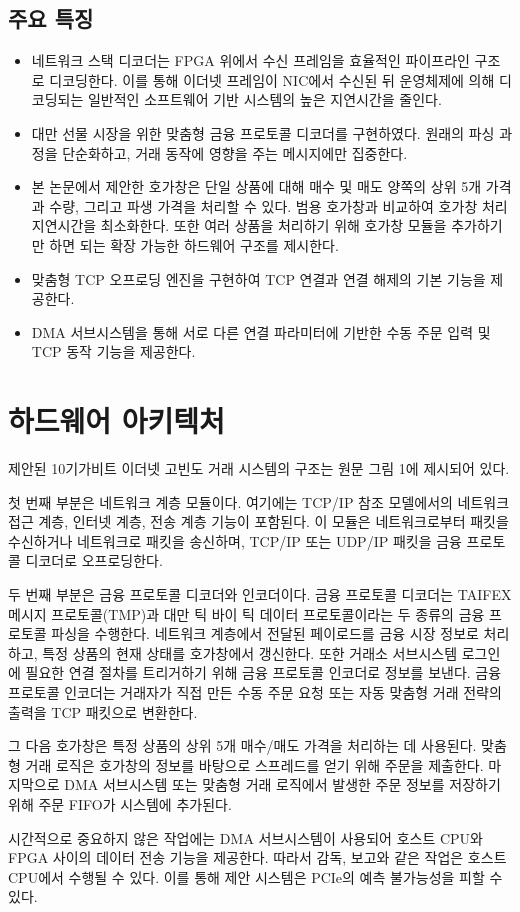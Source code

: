 \documentclass[11pt,a4paper]{article}
\begin{document}
\subsection{주요 특징}
\begin{itemize}
    \item 네트워크 스택 디코더는 FPGA 위에서 수신 프레임을 효율적인 파이프라인 구조로 디코딩한다. 이를 통해 이더넷 프레임이 NIC에서 수신된 뒤 운영체제에 의해 디코딩되는 일반적인 소프트웨어 기반 시스템의 높은 지연시간을 줄인다.
    \item 대만 선물 시장을 위한 맞춤형 금융 프로토콜 디코더를 구현하였다. 원래의 파싱 과정을 단순화하고, 거래 동작에 영향을 주는 메시지에만 집중한다.
    \item 본 논문에서 제안한 호가창은 단일 상품에 대해 매수 및 매도 양쪽의 상위 5개 가격과 수량, 그리고 파생 가격을 처리할 수 있다. 범용 호가창과 비교하여 호가창 처리 지연시간을 최소화한다. 또한 여러 상품을 처리하기 위해 호가창 모듈을 추가하기만 하면 되는 확장 가능한 하드웨어 구조를 제시한다.
    \item 맞춤형 TCP 오프로딩 엔진을 구현하여 TCP 연결과 연결 해제의 기본 기능을 제공한다.
    \item DMA 서브시스템을 통해 서로 다른 연결 파라미터에 기반한 수동 주문 입력 및 TCP 동작 기능을 제공한다.
\end{itemize}

\section{하드웨어 아키텍처}
제안된 10기가비트 이더넷 고빈도 거래 시스템의 구조는 원문 그림 1에 제시되어 있다.

첫 번째 부분은 네트워크 계층 모듈이다. 여기에는 TCP/IP 참조 모델에서의 네트워크 접근 계층, 인터넷 계층, 전송 계층 기능이 포함된다. 이 모듈은 네트워크로부터 패킷을 수신하거나 네트워크로 패킷을 송신하며, TCP/IP 또는 UDP/IP 패킷을 금융 프로토콜 디코더로 오프로딩한다.

두 번째 부분은 금융 프로토콜 디코더와 인코더이다. 금융 프로토콜 디코더는 TAIFEX 메시지 프로토콜(TMP)과 대만 틱 바이 틱 데이터 프로토콜이라는 두 종류의 금융 프로토콜 파싱을 수행한다. 네트워크 계층에서 전달된 페이로드를 금융 시장 정보로 처리하고, 특정 상품의 현재 상태를 호가창에서 갱신한다. 또한 거래소 서브시스템 로그인에 필요한 연결 절차를 트리거하기 위해 금융 프로토콜 인코더로 정보를 보낸다. 금융 프로토콜 인코더는 거래자가 직접 만든 수동 주문 요청 또는 자동 맞춤형 거래 전략의 출력을 TCP 패킷으로 변환한다.

그 다음 호가창은 특정 상품의 상위 5개 매수/매도 가격을 처리하는 데 사용된다. 맞춤형 거래 로직은 호가창의 정보를 바탕으로 스프레드를 얻기 위해 주문을 제출한다. 마지막으로 DMA 서브시스템 또는 맞춤형 거래 로직에서 발생한 주문 정보를 저장하기 위해 주문 FIFO가 시스템에 추가된다.

시간적으로 중요하지 않은 작업에는 DMA 서브시스템이 사용되어 호스트 CPU와 FPGA 사이의 데이터 전송 기능을 제공한다. 따라서 감독, 보고와 같은 작업은 호스트 CPU에서 수행될 수 있다. 이를 통해 제안 시스템은 PCIe의 예측 불가능성을 피할 수 있다.
\end{document}
